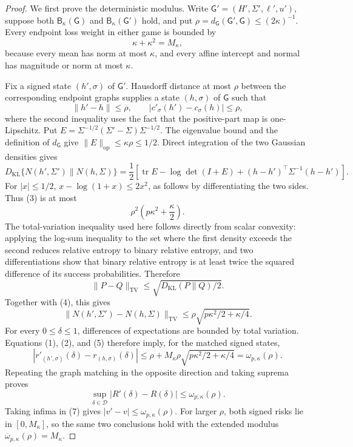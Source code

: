 \documentclass{article}
\begin{document}
\begin{proof}
We first prove the deterministic modulus. Write \(\mathsf G'=(H',\Sigma',\ell',u')\), suppose both \(\mathsf B_{\kappa}(\mathsf G)\) and \(\mathsf B_{\kappa}(\mathsf G')\) hold, and put \(\rho=d_{\mathsf G}(\mathsf G',\mathsf G)\leq(2\kappa)^{-1}\). Every endpoint loss weight in either game is bounded by
\[
 \kappa+\kappa^2=M_{\kappa}, \tag{1}
\]
because every mean has norm at most \(\kappa\), and every affine intercept and normal has magnitude or norm at most \(\kappa\).

Fix a signed state \((h',\sigma)\) of \(\mathsf G'\). Hausdorff distance at most \(\rho\) between the corresponding endpoint graphs supplies a state \((h,\sigma)\) of \(\mathsf G\) such that
\[
 \|h'-h\|\leq\rho,
 \qquad |c'_{\sigma}(h')-c_{\sigma}(h)|\leq\rho, \tag{2}
\]
where the second inequality uses the fact that the positive-part map is one-Lipschitz. Put \(E=\Sigma^{-1/2}(\Sigma'-\Sigma)\Sigma^{-1/2}\). The eigenvalue bound and the definition of \(d_{\mathsf G}\) give
\(\|E\|_{\mathrm{op}}\leq\kappa\rho\leq1/2\). Direct integration of the two Gaussian densities gives
\[
 D_{\mathrm{KL}}\{N(h',\Sigma')\|N(h,\Sigma)\}
 =\frac12\left[\operatorname{tr}E-\log\det(I+E)
 +(h-h')^{\top}\Sigma^{-1}(h-h')\right]. \tag{3}
\]
For \(|x|\leq1/2\), \(x-\log(1+x)\leq2x^2\), as follows by differentiating the two sides. Thus (3) is at most
\[
 \rho^2\left(p\kappa^2+\frac\kappa2\right). \tag{4}
\]
The total-variation inequality used here follows directly from scalar convexity: applying the log-sum inequality to the set where the first density exceeds the second reduces relative entropy to binary relative entropy, and two differentiations show that binary relative entropy is at least twice the squared difference of its success probabilities. Therefore
\[
 \|P-Q\|_{\mathrm{TV}}\leq\sqrt{D_{\mathrm{KL}}(P\|Q)/2}.
\]
Together with (4), this gives
\[
 \|N(h',\Sigma')-N(h,\Sigma)\|_{\mathrm{TV}}
 \leq\rho\sqrt{p\kappa^2/2+\kappa/4}. \tag{5}
\]
For every \(0\leq\delta\leq1\), differences of expectations are bounded by total variation. Equations (1), (2), and (5) therefore imply, for the matched signed states,
\[
 |r'_{(h',\sigma)}(\delta)-r_{(h,\sigma)}(\delta)|
 \leq\rho+M_{\kappa}\rho\sqrt{p\kappa^2/2+\kappa/4}
 =\omega_{p,\kappa}(\rho). \tag{6}
\]
Repeating the graph matching in the opposite direction and taking suprema proves
\[
 \sup_{\delta\in\mathcal D}|R'(\delta)-R(\delta)|
 \leq\omega_{p,\kappa}(\rho). \tag{7}
\]
Taking infima in (7) gives \(|v'-v|\leq\omega_{p,\kappa}(\rho)\). For larger \(\rho\), both signed risks lie in \([0,M_{\kappa}]\), so the same two conclusions hold with the extended modulus \(\overline\omega_{p,\kappa}(\rho)=M_{\kappa}\).


\end{proof}
\end{document}

